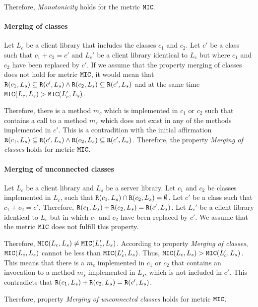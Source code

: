 Therefore, \textit{Monotonicity} holds for the metric $\verb|MIC|$.

\paragraph{Merging of classes}
Let $L_c$ be a client library that includes the classes $c_1$ and $c_2$. Let $c'$ be a class such that $c_1 + c_2 = c'$ and $L_c'$ be a client library identical to $L_c$ but where $c_1$ and $c_2$ have been replaced by $c'$. If we assume that the property merging of classes does not hold for metric $\verb|MIC|$, it would mean that $\verb|R|(c_1, L_s) \subseteq \verb|R|(c', L_s) \land \verb|R|(c_2, L_s) \subseteq \verb|R|(c', L_s)$ and at the same time $\verb|MIC|(L_c, L_s) > \verb|MIC|(L_c', L_s)$.

Therefore, there is a method $m_c$ which is implemented in $c_1$ or $c_2$ such that contains a call to a method $m_s$ which does not exist in any of the methods implemented in $c'$. This is a contradition with the initial affirmation $\verb|R|(c_1, L_s) \subseteq \verb|R|(c', L_s) \land \verb|R|(c_2, L_s) \subseteq \verb|R|(c', L_s)$. Therefore, the property \textit{Merging of classes} holds for metric $\verb|MIC|$.

\paragraph{Merging of unconnected classes}
Let $L_c$ be a client library and $L_s$ be a server library. Let $c_1$ and $c_2$ be classes implemented in $L_c$, such that $\verb|R|(c_1, L_s) \cap \verb|R|(c_2, L_s) = \emptyset$. Let $c'$ be a class such that $c_1 + c_2 = c'$. Therefore, $\verb|R|(c_1, L_s) + \verb|R|(c_2, L_s) = \verb|R|(c', L_s)$. Let $L_c'$ be a client library identical to $L_c$ but in which $c_1$ and $c_2$ have been replaced by $c'$. We assume that the metric $\verb|MIC|$ does not fulfill this property.

Therefore, $\verb|MIC|(L_c, L_s) \neq \verb|MIC|(L_c', L_s)$. According to property \textit{Merging of classes}, $\verb|MIC|(L_c, L_s)$ cannot be less than $\verb|MIC|(L_c', L_s)$. Thus, $\verb|MIC|(L_c, L_s) > \verb|MIC|(L_c', L_s)$. This means that there is a $m_c$ implemented in $c_1$ or $c_2$ that contains an invocation to a method $m_s$ implemented in $L_s$, which is not included in $c'$. This contradicts that $\verb|R|(c_1, L_s) + \verb|R|(c_2, L_s) = \verb|R|(c', L_s)$.

Therefore, property \textit{Merging of unconnected classes} holds for metric $\verb|MIC|$.


